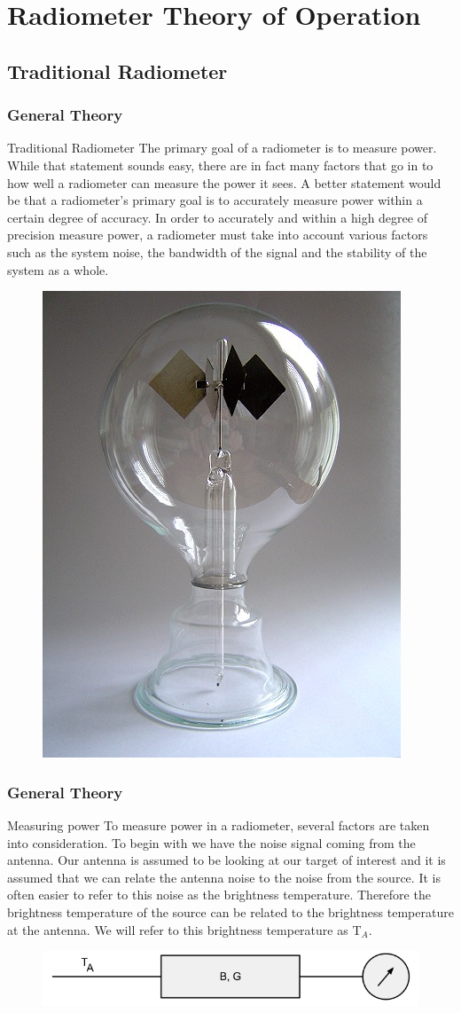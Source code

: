 \documentclass{beamer}
\begin{document}
\section{Radiometer Theory of Operation}
\subsection{Traditional Radiometer}
\begin{frame}
\frametitle{General Theory}
\begin{block}{Traditional Radiometer}
The primary goal of a radiometer is to measure power.  While that statement sounds easy, there are in fact many factors that go in to how well a radiometer can measure the power it sees.  A better statement would be that a radiometer's primary goal is to accurately measure power within a certain degree of accuracy.  In order to accurately and within a high degree of precision measure power, a radiometer must take into account various factors such as the system noise, the bandwidth of the signal and the stability of the system as a whole. 
\end{block}

\begin{figure}\label{crookes}
\includegraphics[width=0.15\linewidth]{images/Crookes_radiometer.jpg}
\end{figure}
\end{frame}

\begin{frame}
\frametitle{General Theory}
\begin{block}{Measuring power}
To measure power in a radiometer, several factors are taken into consideration.  To begin with we have the noise signal coming from the antenna.  Our antenna is assumed to be looking at our target of interest and it is assumed that we can relate the antenna noise to the noise from the source.  It is often easier to refer to this noise as the brightness temperature.  Therefore the brightness temperature of the source can be related to the brightness temperature at the antenna.  We will refer to this brightness temperature as T$_{A}$.  

{\begin{figure}[h!tb] 
\centering
\includegraphics[width=\textwidth]{../Images/simple_rad.png}
\label{simplerad}
\end{figure}
}
\end{block}
\end{frame}
\end{document}
